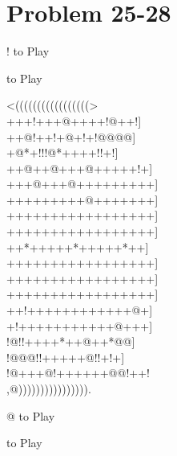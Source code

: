 \documentclass[mcrownvopaper,10pt,onecolumn,final]{memoir}
\begin{document}
\section{Problem 25-28}
\begin{minipage}[c]{0.5\linewidth}
    \hspace{8.3mm} {\gnos%
        !
    }
    to Play
\end{minipage}
\begin{minipage}[c]{0.5\linewidth}
    \hspace{27mm}{\gnos%
        @
    }
    to Play
\end{minipage}
\begin{minipage}[c]{\linewidth}
    \centering
    {\gnos%
    <(((((((((((((((((>\\
    +++!+++@++++!@++!]\\
    ++@!++!+@+!+!@@@@]\\
    +@*+!!!@*++++!!+!]\\
    ++@++@+++@+++++!+]\\
    +++@+++@+++++++++]\\
    +++++++++@+++++++]\\
    +++++++++++++++++]\\
    +++++++++++++++++]\\
    ++*+++++*+++++*++]\\
    +++++++++++++++++]\\
    +++++++++++++++++]\\
    +++++++++++++++++]\\
    ++!++++++++++++@+]\\
    +!+++++++++++@+++]\\
    !@!!++++*++@++*@@]\\
    !@@@!!+++++@!!+!+]\\
          !@+++@!++++++@@!++!\\
          ,@)))))))))))))))).\\
    }
\end{minipage}
\begin{minipage}[c]{0.5\linewidth}
    \hspace{8.3mm} {\gnos%
        @
    }
    to Play
\end{minipage}
\begin{minipage}[c]{0.5\linewidth}
    \hspace{27mm}{\gnos%
        !
    }
    to Play
\end{minipage}
\newpage
\end{document}
